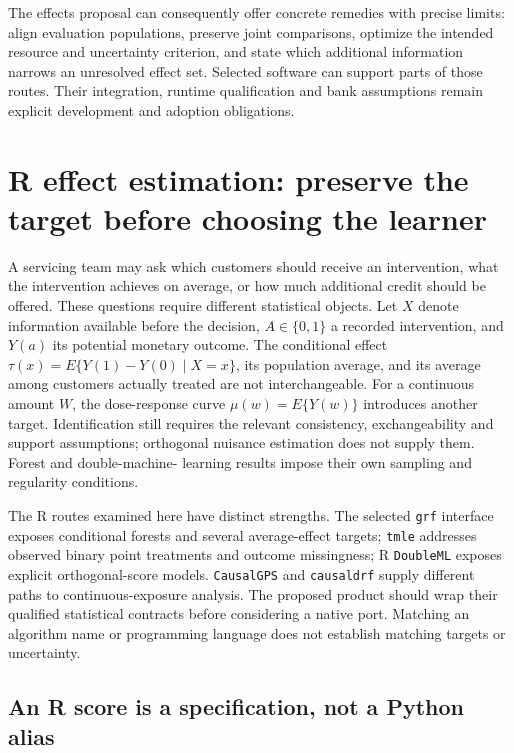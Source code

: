 The effects proposal can consequently offer concrete remedies with precise
limits: align evaluation populations, preserve joint comparisons, optimize
the intended resource and uncertainty criterion, and state which additional
information narrows an unresolved effect set. Selected software can support
parts of those routes. Their integration, runtime qualification and bank
assumptions remain explicit development and adoption obligations.
\label{exec17:s4-extension-end}


\section{R effect estimation: preserve the target before choosing the learner}
\label{exec20:rfx-scope}

A servicing team may ask which customers should receive an intervention, what
the intervention achieves on average, or how much additional credit should be
offered. These questions require different statistical objects. Let $X$ denote
information available before the decision, $A\in\{0,1\}$ a recorded intervention,
and $Y(a)$ its potential monetary outcome. The conditional effect
$\tau(x)=E\{Y(1)-Y(0)\mid X=x\}$, its population average, and its average among
customers actually treated are not interchangeable. For a continuous amount $W$,
the dose-response curve $\mu(w)=E\{Y(w)\}$ introduces another target. Identification
still requires the relevant consistency, exchangeability and support assumptions;
orthogonal nuisance estimation does not supply them. Forest and double-machine-
learning results impose their own sampling and regularity conditions.
\citep{dml2018,grf2018}

The R routes examined here have distinct strengths. The selected \texttt{grf}
interface exposes conditional forests and several average-effect targets;
\texttt{tmle} addresses observed binary point treatments and outcome missingness;
R \texttt{DoubleML} exposes explicit orthogonal-score models. \texttt{CausalGPS}
and \texttt{causaldrf} supply different paths to continuous-exposure analysis.
The proposed product should wrap their qualified statistical contracts before
considering a native port. Matching an algorithm name or programming language
does not establish matching targets or uncertainty.
\citep{exec13_grf_rpath,exec20_rfx_tmle,exec20_rfx_doubleml_r,
exec20_rfx_causalgps,exec20_rfx_causaldrf}

\subsection{An R score is a specification, not a Python alias}

